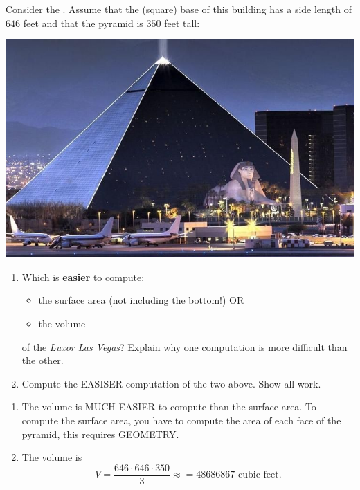 \documentclass[handout,nooutcomes,noauthor,hints]{ximera}
\begin{document}
 \begin{question}   Consider the .  Assume that the (square) base of this building has a side length of
 $646$ feet and that the pyramid is $350$ feet tall:
  \begin{center}
    \includegraphics[width=.4\textwidth]{pyramid.jpg} 
  \end{center}

  \begin{enumerate}
  \item Which is \textbf{easier} to compute:
    \begin{itemize}
    \item the surface area (not including the bottom!) OR
    \item the volume
    \end{itemize}
    of the \textit{Luxor Las Vegas}?
    Explain why one computation is more difficult than the other.
    \item Compute the EASISER computation of the two above. Show all
      work.
  \end{enumerate}

   \begin{freeResponse}
    \begin{enumerate}
      \item The volume is MUCH EASIER to compute than the surface
        area. To compute the surface area, you have to compute the
        area of each face of the pyramid, this requires GEOMETRY.

      \item The volume is
        \[
        V = \frac{646\cdot 646\cdot 350}{3} \approx = 48686867 \text{ cubic feet}.
        \]
    \end{enumerate}
  \end{freeResponse}
\end{question}

\mynewpage
\end{document}
